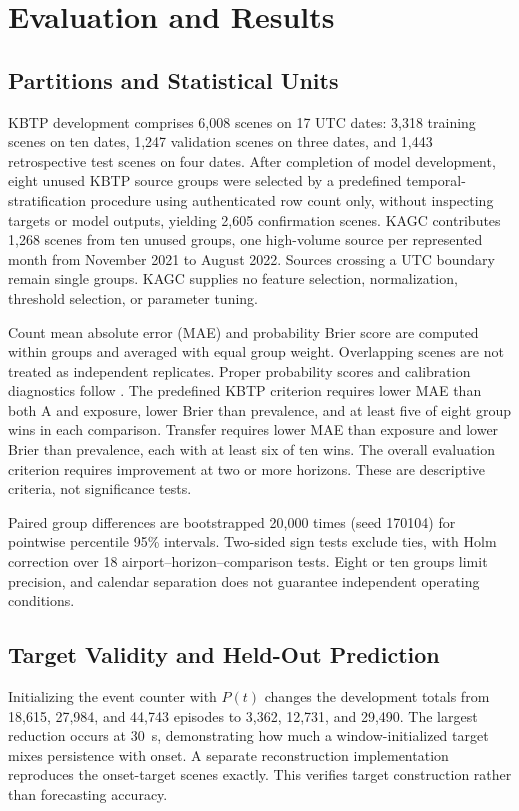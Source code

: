 \documentclass[10pt,journal,letterpaper]{IEEEtran}
\begin{document}
\section{Evaluation and Results}
\subsection{Partitions and Statistical Units}
KBTP development comprises 6,008 scenes on 17 UTC dates: 3,318 training scenes on ten dates, 1,247 validation scenes on three dates, and 1,443 retrospective test scenes on four dates. After completion of model development, eight unused KBTP source groups were selected by a predefined temporal-stratification procedure using authenticated row count only, without inspecting targets or model outputs, yielding 2,605 confirmation scenes. KAGC contributes 1,268 scenes from ten unused groups, one high-volume source per represented month from November 2021 to August 2022. Sources crossing a UTC boundary remain single groups. KAGC supplies no feature selection, normalization, threshold selection, or parameter tuning.

Count mean absolute error (MAE) and probability Brier score are computed within groups and averaged with equal group weight. Overlapping scenes are not treated as independent replicates. Proper probability scores and calibration diagnostics follow \cite{gneiting2007proper,gneiting2007calibration}. The predefined KBTP criterion requires lower MAE than both A and exposure, lower Brier than prevalence, and at least five of eight group wins in each comparison. Transfer requires lower MAE than exposure and lower Brier than prevalence, each with at least six of ten wins. The overall evaluation criterion requires improvement at two or more horizons. These are descriptive criteria, not significance tests.

Paired group differences are bootstrapped 20,000 times (seed 170104) for pointwise percentile 95\% intervals. Two-sided sign tests exclude ties, with Holm correction over 18 airport--horizon--comparison tests. Eight or ten groups limit precision, and calendar separation does not guarantee independent operating conditions.



\subsection{Target Validity and Held-Out Prediction}
Initializing the event counter with $P(t)$ changes the development totals from 18,615, 27,984, and 44,743 episodes to 3,362, 12,731, and 29,490. The largest reduction occurs at 30~s, demonstrating how much a window-initialized target mixes persistence with onset. A separate reconstruction implementation reproduces the onset-target scenes exactly. This verifies target construction rather than forecasting accuracy.
\end{document}
